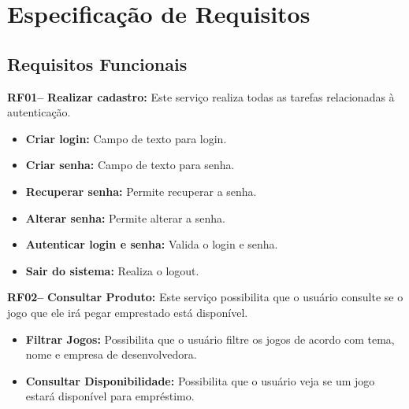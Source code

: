 \documentclass[a4paper, 12pt]{article}
\begin{document}


\section{Especificação de Requisitos}
\subsection{Requisitos Funcionais}
\textbf{RF01--} \textbf{Realizar cadastro:} Este serviço realiza todas as tarefas relacionadas à autenticação.
\begin{itemize}
    \item \textbf{Criar login:} Campo de texto para login.
    \item \textbf{Criar senha:} Campo de texto para senha.
    \item \textbf{Recuperar senha:} Permite recuperar a senha.
    \item \textbf{Alterar senha:} Permite alterar a senha.
    \item \textbf{Autenticar login e senha:} Valida o login e senha.
    \item \textbf{Sair do sistema:} Realiza o logout.
\end{itemize}

\textbf{RF02--} \textbf{Consultar Produto:} Este serviço possibilita que o usuário consulte se o jogo que ele irá pegar emprestado está disponível.
\begin{itemize}
    \item \textbf{Filtrar Jogos:} Possibilita que o usuário filtre os jogos de acordo com tema, nome e empresa de desenvolvedora.
    \item \textbf{Consultar Disponibilidade:} Possibilita que o usuário veja se um jogo estará disponível para empréstimo.
\end{itemize}
\end{document}

